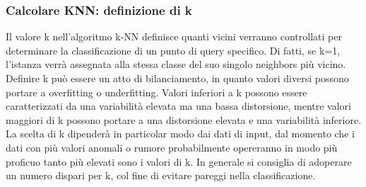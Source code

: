\subsubsection{Calcolare KNN: definizione di k}
Il valore k nell'algoritmo k-NN definisce quanti vicini verranno controllati per determinare la classificazione di un punto di query specifico. 
Di fatti, se k=1, l'istanza verrà assegnata alla stessa classe del suo singolo neighbors più vicino. 
Definire k può essere un atto di bilanciamento, in quanto valori diversi possono portare a overfitting o underfitting. 
Valori inferiori a k possono essere caratterizzati da una variabilità elevata ma una bassa distorsione, mentre valori maggiori di k possono portare a una distorsione elevata e una variabilità inferiore. 
La scelta di k dipenderà in particolar modo dai dati di input, dal momento che i dati con più valori anomali o rumore probabilmente opereranno in modo più proficuo tanto più elevati sono i valori di k. 
In generale si consiglia di adoperare un numero dispari per k, col fine di evitare pareggi nella classificazione.

